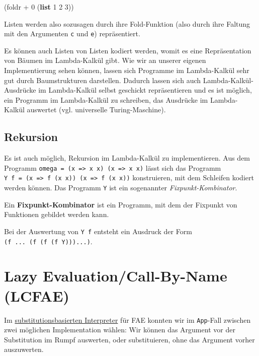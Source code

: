 \documentclass[]{article}
\newenvironment{Shaded}{}{}
\newcommand{\DecValTok}[1]{\textcolor[rgb]{0.25,0.63,0.44}{#1}}
\newcommand{\KeywordTok}[1]{\textcolor[rgb]{0.00,0.44,0.13}{\textbf{#1}}}
\newcommand{\NormalTok}[1]{#1}
\newcommand{\OperatorTok}[1]{\textcolor[rgb]{0.40,0.40,0.40}{#1}}
\begin{document}
\begin{Shaded}
\begin{Highlighting}[]
\NormalTok{(foldr }\OperatorTok{+} \DecValTok{0}\NormalTok{ (}\KeywordTok{list} \DecValTok{1} \DecValTok{2} \DecValTok{3}\NormalTok{))}
\end{Highlighting}
\end{Shaded}

Listen werden also sozusagen durch ihre Fold-Funktion (also durch ihre
Faltung mit den Argumenten \texttt{c} und \texttt{e}) repräsentiert.

Es können auch Listen von Listen kodiert werden, womit es eine
Repräsentation von Bäumen im Lambda-Kalkül gibt. Wie wir an unserer
eigenen Implementierung sehen können, lassen sich Programme im
Lambda-Kalkül sehr gut durch Baumstrukturen darstellen. Dadurch lassen
sich auch Lambda-Kalkül-Ausdrücke im Lambda-Kalkül selbst geschickt
repräsentieren und es ist möglich, ein Programm im Lambda-Kalkül zu
schreiben, das Ausdrücke im Lambda-Kalkül auswertet (vgl. universelle
Turing-Maschine).

\hypertarget{rekursion}{%
\subsection{Rekursion}\label{rekursion}}

Es ist auch möglich, Rekursion im Lambda-Kalkül zu implementieren. Aus
dem Programm
\texttt{omega\ =\ (x\ =\textgreater{}\ x\ x)\ (x\ =\textgreater{}\ x\ x)}
lässt sich das Programm
\texttt{Y\ f\ =\ (x\ =\textgreater{}\ f\ (x\ x))\ (x\ =\textgreater{}\ f\ (x\ x))}
konstruieren, mit dem Schleifen kodiert werden können. Das Programm
\texttt{Y} ist ein sogenannter \emph{Fixpunkt-Kombinator}.

Ein \textbf{Fixpunkt-Kombinator} ist ein Programm, mit dem der Fixpunkt
von Funktionen gebildet werden kann.

Bei der Auswertung von \texttt{Y\ f} entsteht ein Ausdruck der Form
\texttt{(f\ ...\ (f\ (f\ (f\ Y)))...)}.

\hypertarget{lazy-evaluationcall-by-name-lcfae}{%
\section{Lazy Evaluation/Call-By-Name
(LCFAE)}\label{lazy-evaluationcall-by-name-lcfae}}

Im
\protect\hyperlink{substitutionsbasierter-interpreter-a}{substitutionsbasierten
Interpreter} für FAE konnten wir im \texttt{App}-Fall zwischen zwei
möglichen Implementation wählen: Wir können das Argument vor der
Substitution im Rumpf auswerten, oder substituieren, ohne das Argument
vorher auszuwerten.
\end{document}
